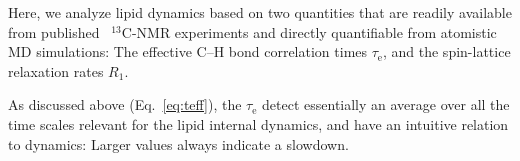\documentclass[journal=jcisd8,manuscript=article,layout=twocolumn]{achemso}
\begin{document}
Here, we analyze lipid dynamics based on two quantities that are readily available
from published~\cite{ferreira15,pham15,Volke:1995a,Antila:2020a} $^{13}$C-NMR experiments and
directly quantifiable from atomistic MD simulations:
The effective C--H bond correlation times $\tau_\mathrm{e}$, and
the spin-lattice relaxation rates $R_1$.

As discussed above (Eq.~\eqref{eq:teff}), the $\tau_\mathrm{e}$ detect essentially an average over all the time scales relevant for the lipid internal dynamics, and
have an intuitive relation to dynamics: Larger values always indicate a slowdown.  
%
%
\end{document}
